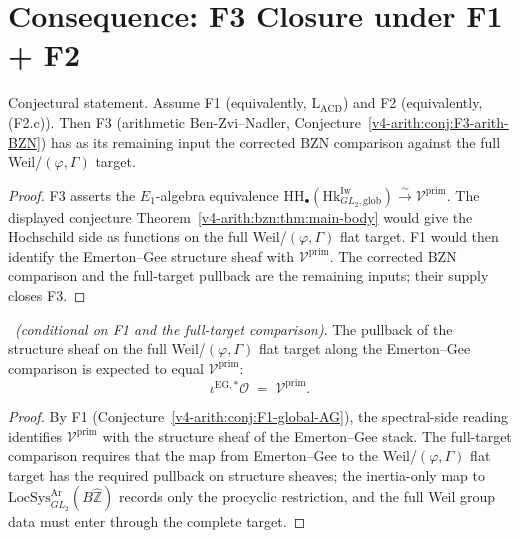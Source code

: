 \section{Consequence: F3 Closure under F1 + F2}
\label{v4-arith:bzn:F3-closure}

\begin{theorem}
\label{v4-arith:bzn:thm:F3-is-theorem}
Conjectural statement. Assume F1 (equivalently,
\(\mathrm{L}_{\mathrm{ACD}}\)) and F2 (equivalently, (F2.c)). Then
F3 (arithmetic Ben-Zvi--Nadler, Conjecture~\ref{v4-arith:conj:F3-arith-BZN})
has as its remaining input the corrected BZN comparison against the
full Weil/\((\varphi,\Gamma)\) target.
\end{theorem}

\begin{proof}
F3 asserts the \(E_{1}\)-algebra equivalence
\(\mathrm{HH}_{\bullet}(\mathrm{Hk}^{\mathrm{Iw}}_{GL_{2},\mathrm{glob}})\xrightarrow{\sim}\mathcal{V}^{\mathrm{prim}}\).
The displayed conjecture Theorem~\ref{v4-arith:bzn:thm:main-body} would
give the Hochschild side as functions on the full
Weil/\((\varphi,\Gamma)\) flat target. F1 would then identify the
Emerton--Gee structure sheaf with \(\mathcal{V}^{\mathrm{prim}}\).
The corrected BZN comparison and the full-target pullback are the
remaining inputs; their supply closes F3.
\end{proof}

\begin{theorem}
\label{v4-arith:bzn:thm:pullback-to-V-prim}
\ \emph{(conditional on F1 and the full-target comparison)}.
The pullback of the structure sheaf on the full
Weil/\((\varphi,\Gamma)\) flat target along the Emerton--Gee comparison
is expected to equal
\(\mathcal{V}^{\mathrm{prim}}\):
\begin{equation}
\iota^{\mathrm{EG},*}\mathcal{O}\;=\;\mathcal{V}^{\mathrm{prim}}.
\end{equation}
\end{theorem}

\begin{proof}
By F1 (Conjecture~\ref{v4-arith:conj:F1-global-AG}), the spectral-side reading
identifies \(\mathcal{V}^{\mathrm{prim}}\) with the structure sheaf of
the Emerton--Gee stack. The full-target comparison requires that the map from Emerton--Gee
to the Weil/\((\varphi,\Gamma)\) flat target has the required pullback
on structure sheaves; the inertia-only map to
\(\mathrm{LocSys}^{\mathrm{Ar}}_{GL_{2}}(B\widehat{\mathbb{Z}})\)
records only the procyclic restriction, and the full Weil group data
must enter through the complete target.
\end{proof}


